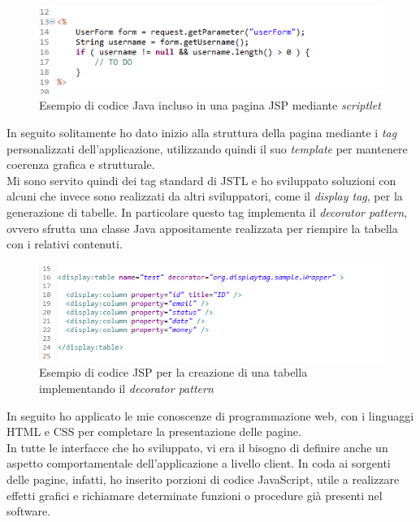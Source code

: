 	\begin{figure}[H]
		\centering
	   	\includegraphics[width=1\textwidth]{immagini/codice_scriptlet}
	   	\caption{Esempio di codice Java incluso in una pagina JSP mediante \textit{scriptlet}}
	\end{figure}
	
	In seguito solitamente ho dato inizio alla struttura della pagina mediante i \textit{tag} personalizzati dell'applicazione, utilizzando quindi il suo \textit{template} per mantenere coerenza grafica e strutturale.\\
	
	Mi sono servito quindi dei tag standard di JSTL e ho sviluppato soluzioni con alcuni che invece sono realizzati da altri sviluppatori, come il \textit{display tag}, per la generazione di tabelle. In particolare questo tag implementa il \textit{decorator pattern}, ovvero sfrutta una classe Java appositamente realizzata per riempire la tabella con i relativi contenuti.
	
	\begin{figure}[H]
		\centering
	   	\includegraphics[width=1\textwidth]{immagini/display_tag}
	   	\caption{Esempio di codice JSP per la creazione di una tabella implementando il \textit{decorator pattern}}
	\end{figure}
	
	In seguito ho applicato le mie conoscenze di programmazione web, con i linguaggi HTML e CSS per completare la presentazione delle pagine.\\
	
	In tutte le interfacce che ho sviluppato, vi era il bisogno di definire anche un aspetto comportamentale dell'applicazione a livello client. In coda ai sorgenti delle pagine, infatti, ho inserito porzioni di codice JavaScript, utile a realizzare effetti grafici e richiamare determinate funzioni o procedure già presenti nel software.\\
	
